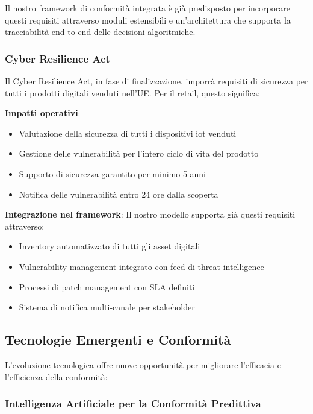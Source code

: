 Il nostro framework di conformità integrata è già predisposto per incorporare questi requisiti attraverso moduli estensibili e un'architettura che supporta la tracciabilità end-to-end delle decisioni algoritmiche.

\subsubsection{Cyber Resilience Act}

Il Cyber Resilience Act, in fase di finalizzazione, imporrà requisiti di sicurezza per tutti i prodotti digitali venduti nell'UE. Per il retail, questo significa:

\textbf{Impatti operativi}:
\begin{itemize}
    \item Valutazione della sicurezza di tutti i dispositivi \gls{iot} venduti
    \item Gestione delle vulnerabilità per l'intero ciclo di vita del prodotto
    \item Supporto di sicurezza garantito per minimo 5 anni
    \item Notifica delle vulnerabilità entro 24 ore dalla scoperta
\end{itemize}

\textbf{Integrazione nel framework}:
Il nostro modello supporta già questi requisiti attraverso:
\begin{itemize}
    \item Inventory automatizzato di tutti gli asset digitali
    \item Vulnerability management integrato con feed di threat intelligence
    \item Processi di patch management con SLA definiti
    \item Sistema di notifica multi-canale per stakeholder
\end{itemize}

\subsection{Tecnologie Emergenti e Conformità}
\label{subsec:4.9.2_tecnologie}

L'evoluzione tecnologica offre nuove opportunità per migliorare l'efficacia e l'efficienza della conformità:

\subsubsection{Intelligenza Artificiale per la Conformità Predittiva}

